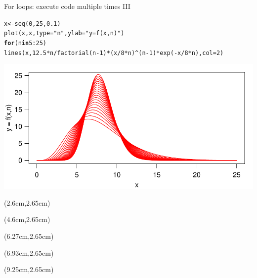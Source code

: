 \documentclass[xcolor=table,      handout ,    xcolor=dvipsnames]{beamer}\usepackage[]{graphicx}\usepackage[]{color}
\makeatletter
\newcommand{\hlnum}[1]{\textcolor[rgb]{0,0,0}{#1}}
\newcommand{\hlstr}[1]{\textcolor[rgb]{0.545,0.137,0.137}{#1}}
\newcommand{\hlopt}[1]{\textcolor[rgb]{0,0,0}{#1}}
\newcommand{\hlstd}[1]{\textcolor[rgb]{0,0,0}{#1}}
\newcommand{\hlkwa}[1]{\textcolor[rgb]{1,0,0}{\textbf{#1}}}
\newcommand{\hlkwb}[1]{\textcolor[rgb]{0,0,0}{#1}}
\newcommand{\hlkwc}[1]{\textcolor[rgb]{1,0,1}{#1}}
\newcommand{\hlkwd}[1]{\textcolor[rgb]{0,0,1}{#1}}
\newenvironment{kframe}{%
 \def\at@end@of@kframe{}%
 \ifinner\ifhmode%
  \def\at@end@of@kframe{\end{minipage}}%
  \begin{minipage}{\columnwidth}%
 \fi\fi%
 \def\FrameCommand##1{\hskip\@totalleftmargin \hskip-\fboxsep
 \colorbox{shadecolor}{##1}\hskip-\fboxsep
     \hskip-\linewidth \hskip-\@totalleftmargin \hskip\columnwidth}%
 \MakeFramed {\advance\hsize-\width
   \@totalleftmargin\z@ \linewidth\hsize
   \@setminipage}}%
 {\par\unskip\endMakeFramed%
 \at@end@of@kframe}
\newenvironment{knitrout}{}{} %
\makeatother
\begin{document}
\begin{frame}[fragile]{For loops: execute code multiple times III}
\begin{knitrout}\footnotesize
{}\color{fgcolor}\begin{kframe}
\begin{alltt}
\hlstd{x} \hlkwb{<-} \hlkwd{seq}\hlstd{(}\hlnum{0}\hlstd{,}\hlnum{25}\hlstd{,}\hlnum{0.1}\hlstd{)}
\hlkwd{plot}\hlstd{(x,x,} \hlkwc{type}\hlstd{=}\hlstr{"n"}\hlstd{,} \hlkwc{ylab}\hlstd{=}\hlstr{"y = f(x,n)"}\hlstd{)}
\hlkwa{for} \hlstd{(n} \hlkwa{in} \hlnum{5}\hlopt{:}\hlnum{25}\hlstd{)}
\hlkwd{lines}\hlstd{(x,} \hlnum{12.5}\hlopt{*}\hlstd{n}\hlopt{/}\hlkwd{factorial}\hlstd{(n}\hlopt{-}\hlnum{1}\hlstd{)}\hlopt{*}\hlstd{(x}\hlopt{/}\hlnum{8}\hlopt{*}\hlstd{n)}\hlopt{^}\hlstd{(n}\hlopt{-}\hlnum{1}\hlstd{)}\hlopt{*}\hlkwd{exp}\hlstd{(}\hlopt{-}\hlstd{x}\hlopt{/}\hlnum{8}\hlopt{*}\hlstd{n),} \hlkwc{col}\hlstd{=}\hlnum{2}\hlstd{)}
\end{alltt}
\end{kframe}

{\centering \includegraphics[width=\textwidth]{./fig/for5-1} 

}



\end{knitrout}
\begin{textblock*}{0.2cm}(2.6cm,2.65cm)
\vspace{0.45cm} ~
\end{textblock*}
%
\begin{textblock*}{0.2cm}(4.6cm,2.65cm)
\vspace{0.45cm} ~
\end{textblock*}
%
\begin{textblock*}{0.2cm}(6.27cm,2.65cm)
\vspace{0.45cm} ~
\end{textblock*}
%
\begin{textblock*}{0.2cm}(6.93cm,2.65cm)
\vspace{0.45cm} ~
\end{textblock*}
%
\begin{textblock*}{0.2cm}(9.25cm,2.65cm)
\vspace{0.45cm} ~
\end{textblock*}
%
\end{frame}
\end{document}
